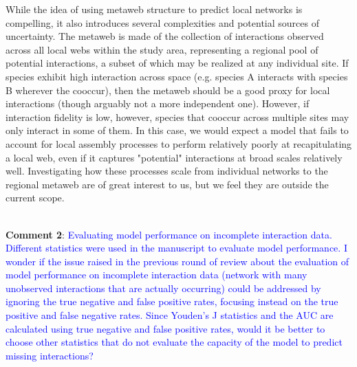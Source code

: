 \documentclass{article}
\begin{document}
   While the idea of using metaweb structure to predict local networks is compelling, it also introduces several complexities and potential sources of uncertainty. The metaweb is made of the collection of interactions observed across all local webs within the study area, representing a regional pool of potential interactions, a subset of which may be realized at any individual site. If species exhibit high interaction across space (e.g. species A interacts with species B wherever the cooccur), then the metaweb should be a good proxy for local interactions (though arguably not a more independent one). However, if interaction fidelity is low, however, species that cooccur across multiple sites may only interact in some of them. In this case, we would expect a model that fails to account for local assembly processes to perform relatively poorly at recapitulating a local web, even if it captures "potential" interactions at broad scales relatively well. Investigating how these processes scale from individual networks to the regional metaweb are of great interest to us, but we feel they are outside the current scope. 


    \\

    \textbf{Comment 2}: \textcolor{blue}{Evaluating model performance on incomplete interaction data.}
    \textcolor{blue}{Different statistics were used in the manuscript to evaluate model performance. I wonder if the issue raised in the previous round of review about the evaluation of model performance on incomplete interaction data (network with many unobserved interactions that are actually occurring) could be addressed by ignoring the true negative and false positive rates, focusing instead on the true positive and false negative rates. Since Youden’s J statistics and the AUC are calculated using true negative and false positive rates, would it be better to choose other statistics that do not evaluate the capacity of the model to predict missing interactions?}
\end{document}
